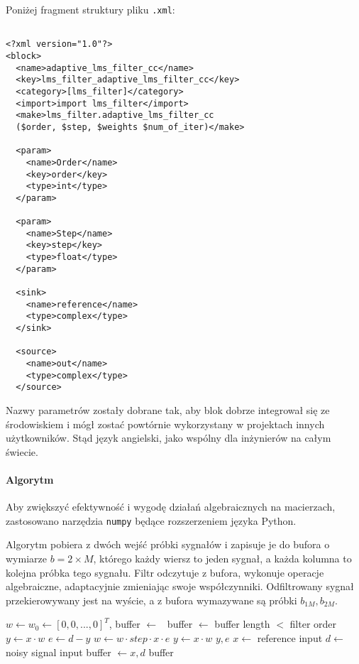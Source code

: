 Poniżej fragment struktury pliku \texttt{.xml}:


\begin{verbatim}

<?xml version="1.0"?>
<block>
  <name>adaptive_lms_filter_cc</name>
  <key>lms_filter_adaptive_lms_filter_cc</key>
  <category>[lms_filter]</category>
  <import>import lms_filter</import>
  <make>lms_filter.adaptive_lms_filter_cc
  ($order, $step, $weights $num_of_iter)</make>

  <param>
    <name>Order</name>
    <key>order</key>
    <type>int</type>
  </param>

  <param>
    <name>Step</name>
    <key>step</key>
    <type>float</type>
  </param>

  <sink>
    <name>reference</name>
    <type>complex</type>
  </sink>

  <source>
    <name>out</name>
    <type>complex</type>
  </source>
\end{verbatim}

Nazwy parametrów zostały dobrane tak, aby blok dobrze integrował się ze środowiskiem i mógł zostać powtórnie wykorzystany w projektach innych użytkowników. Stąd język angielski, jako wspólny dla inżynierów na całym świecie. 

\paragraph{Algorytm}

Aby zwiększyć efektywność i wygodę działań algebraicznych na macierzach, zastosowano narzędzia \texttt{numpy} będące rozszerzeniem języka Python.

Algorytm pobiera z dwóch wejść próbki sygnałów i zapisuje je do bufora o wymiarze $b = 2 \times M$, którego każdy wiersz to jeden sygnał, a każda kolumna to kolejna próbka tego sygnału. 
Filtr odczytuje z bufora, wykonuje operacje algebraiczne, adaptacyjnie zmieniając swoje współczynniki. 
Odfiltrowany sygnał przekierowywany jest na wyście, a z bufora wymazywane są próbki $b_{1M}, b_{2M}$.
\begin{samepage}
\begin{algorithmic}
\Require $w \gets w_0 \gets [0, 0,...,0]^{T}$,
\State buffer $\gets $ 
    \Repeat\ buffer $\gets$  \Until buffer length $<$ filter order
    \State {}
    \State {}
\EndWhile
{}
    \State $y \gets x \cdot w$
    \State $e \gets d - y$
    \State $w \gets  w \cdot step \cdot x \cdot e$
    \State $y \gets x \cdot w$
    \State \Return $y, e$
\EndFor
\EndFunction
{}
    \State $x \gets$ reference input
    \State $d \gets$ noisy signal input
    \State buffer $\gets x, d$
    \State \Return buffer
\EndFunction
\end{algorithmic}
\end{samepage}


